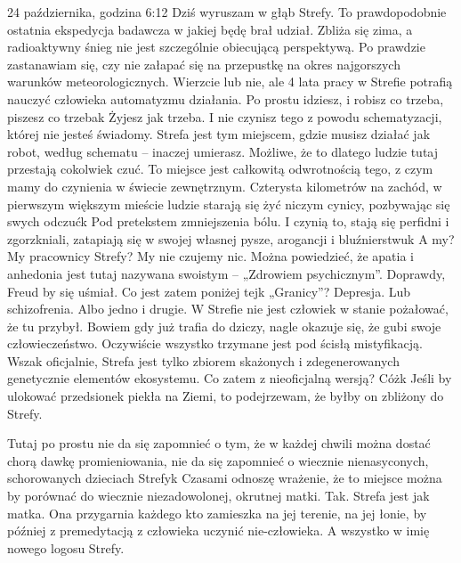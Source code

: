 \documentclass[../MAIN.tex]{subfiles}
\begin{document}
24 października, godzina 6:12
Dziś wyruszam w głąb Strefy. To prawdopodobnie ostatnia
ekspedycja badawcza w jakiej będę brał udział. Zbliża się zima,
a radioaktywny śnieg nie jest szczególnie obiecującą
perspektywą. Po prawdzie zastanawiam się, czy nie załapać się
na przepustkę na okres najgorszych warunków meteorologicznych.
Wierzcie lub nie, ale 4 lata pracy w Strefie potrafią nauczyć
człowieka automatyzmu działania. Po prostu idziesz, i robisz co
trzeba, piszesz co trzeba\3k Żyjesz jak trzeba. I nie czynisz
tego z powodu schematyzacji, której nie jesteś świadomy. Strefa
jest tym miejscem, gdzie musisz działać jak robot, według
schematu – inaczej umierasz. Możliwe, że to dlatego ludzie
tutaj przestają cokolwiek czuć. To miejsce jest całkowitą
odwrotnością tego, z czym mamy do czynienia w świecie
zewnętrznym. Czterysta kilometrów na zachód, w pierwszym
większym mieście ludzie starają się żyć niczym cynicy,
pozbywając się swych odczuć\3k Pod pretekstem zmniejszenia
bólu. I czynią to, stają się perfidni i zgorzkniali, zatapiają
się w swojej własnej pysze, arogancji i bluźnierstwu\3k A my?
My pracownicy Strefy? My nie czujemy nic. Można powiedzieć, że
apatia i anhedonia jest tutaj nazywana swoistym – „Zdrowiem
psychicznym”. Doprawdy, Freud by się uśmiał. Co jest zatem
poniżej tej\3k „Granicy”? Depresja. Lub schizofrenia. Albo
jedno i drugie. W Strefie nie jest człowiek w stanie pożałować,
że tu przybył. Bowiem gdy już trafia do dziczy, nagle okazuje
się, że gubi swoje człowieczeństwo. Oczywiście wszystko
trzymane jest pod ścisłą mistyfikacją. Wszak oficjalnie, Strefa
jest tylko zbiorem skażonych i zdegenerowanych genetycznie
elementów ekosystemu. Co zatem z nieoficjalną wersją? Cóż\3k
Jeśli by ulokować przedsionek piekła na Ziemi, to podejrzewam,
że byłby on zbliżony do Strefy.

Tutaj po prostu nie da się zapomnieć o tym, że w każdej chwili
można dostać chorą dawkę promieniowania, nie da się zapomnieć o
wiecznie nienasyconych, schorowanych dzieciach Strefy\3k
Czasami odnoszę wrażenie, że to miejsce można by porównać do
wiecznie niezadowolonej, okrutnej matki. Tak. Strefa jest jak
matka. Ona przygarnia każdego kto zamieszka na jej terenie, na
jej łonie, by później z premedytacją z człowieka uczynić
nie-człowieka. A wszystko w imię nowego logosu Strefy.
\end{document}
